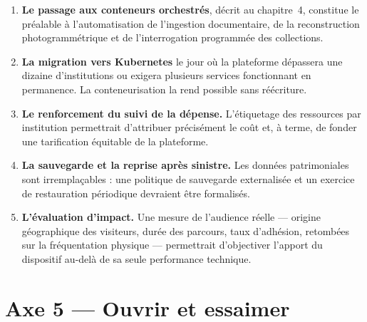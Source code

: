 \begin{enumerate}
  \item \textbf{Le passage aux conteneurs orchestrés}, décrit au chapitre~4,
        constitue le préalable à l'automatisation de l'ingestion documentaire,
        de la reconstruction photogrammétrique et de l'interrogation programmée
        des collections.

  \item \textbf{La migration vers Kubernetes} le jour où la plateforme dépassera
        une dizaine d'institutions ou exigera plusieurs services fonctionnant en
        permanence. La conteneurisation la rend possible sans réécriture.

  \item \textbf{Le renforcement du suivi de la dépense.} L'étiquetage des
        ressources par institution permettrait d'attribuer précisément le coût
        et, à terme, de fonder une tarification équitable de la plateforme.

  \item \textbf{La sauvegarde et la reprise après sinistre.} Les données
        patrimoniales sont irremplaçables : une politique de sauvegarde
        externalisée et un exercice de restauration périodique devraient être
        formalisés.

  \item \textbf{L'évaluation d'impact.} Une mesure de l'audience réelle — origine
        géographique des visiteurs, durée des parcours, taux d'adhésion,
        retombées sur la fréquentation physique — permettrait d'objectiver
        l'apport du dispositif au-delà de sa seule performance technique.
\end{enumerate}

\section*{Axe 5 — Ouvrir et essaimer}


